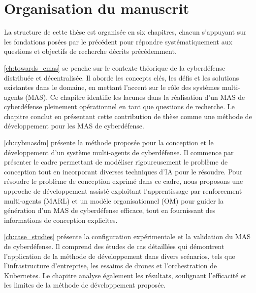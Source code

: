 \section{Organisation du manuscrit}

La structure de cette thèse est organisée en six chapitres, chacun s'appuyant sur les fondations posées par le précédent pour répondre systématiquement aux questions et objectifs de recherche décrits précédemment.


\autoref{ch:towards_cmas} se penche sur le contexte théorique de la cyberdéfense distribuée et décentralisée. Il aborde les concepts clés, les défis et les solutions existantes dans le domaine, en mettant l'accent sur le rôle des systèmes multi-agents (MAS). Ce chapitre identifie les lacunes dans la réalisation d'un MAS de cyberdéfense pleinement opérationnel en tant que questions de recherche. Le chapitre conclut en présentant cette contribution de thèse comme une méthode de développement pour les MAS de cyberdéfense.

\autoref{ch:cybmasdm} présente la méthode proposée pour la conception et le développement d'un système multi-agents de cyberdéfense. Il commence par présenter le cadre permettant de modéliser rigoureusement le problème de conception tout en incorporant diverses techniques d'IA pour le résoudre. Pour résoudre le problème de conception exprimé dans ce cadre, nous proposons une approche de développement assisté exploitant l'apprentissage par renforcement multi-agents (MARL) et un modèle organisationnel (OM) pour guider la génération d'un MAS de cyberdéfense efficace, tout en fournissant des informations de conception explicites.

\autoref{ch:case_studies} présente la configuration expérimentale et la validation du MAS de cyberdéfense. Il comprend des études de cas détaillées qui démontrent l'application de la méthode de développement dans divers scénarios, tels que l'infrastructure d'entreprise, les essaims de drones et l'orchestration de Kubernetes. Le chapitre analyse également les résultats, soulignant l'efficacité et les limites de la méthode de développement proposée.

